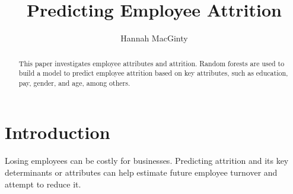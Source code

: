\documentclass[11pt,preprint, authoryear]{elsarticle}
\numberwithin{equation}{section}
\numberwithin{figure}{section}
\numberwithin{table}{section}
\begin{document}
\begin{frontmatter}  %

\title{Predicting Employee Attrition}





\author[Add1]{Hannah MacGinty}





\address[Add1]{Stellenbosch University, South Africa}


\begin{abstract}
\small{
This paper investigates employee attributes and attrition. Random
forests are used to build a model to predict employee attrition based on
key attributes, such as education, pay, gender, and age, among others.
}
\end{abstract}

\vspace{1cm}





\vspace{0.5cm}

\end{frontmatter}

\setcounter{footnote}{0}



\pagestyle{fancy}
\chead{}
\rhead{}
\lfoot{}
\lhead{}
\cfoot{}


\headsep 35pt %




\hypertarget{introduction}{%
\section{\texorpdfstring{Introduction
\label{Introduction}}{Introduction }}\label{introduction}}

Losing employees can be costly for businesses. Predicting attrition and
its key determinants or attributes can help estimate future employee
turnover and attempt to reduce it.
\end{document}
